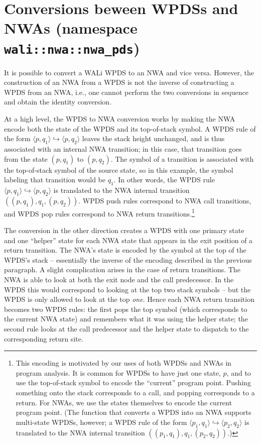 \section{Conversions beween WPDSs and NWAs (namespace
  \texttt{wali::nwa::nwa\_pds})}
\label{Se:Conversions}


It is possible to convert a WALi WPDS to an NWA and vice versa.
However, the construction of an NWA from a WPDS is not the inverse
of constructing a WPDS from an NWA, i.e., one cannot perform the two
conversions in sequence and obtain the identity conversion.

At a high level, the WPDS to NWA conversion works by making the NWA encode both the state
of the WPDS and its top-of-stack symbol. A WPDS rule of the form $\langle
p,q_1 \rangle \hookrightarrow \langle p,q_2 \rangle$ leaves the stack height
unchanged, and is thus associated with an internal NWA transition; in this
case, that transition goes from the state $(p,q_1)$ to $(p,q_2)$. The symbol
of a transition is associated with the top-of-stack symbol of the source
state, so in this example, the symbol labeling that transition would be
$q_1$. In other words, the WPDS rule $\langle p,q_1 \rangle \hookrightarrow
\langle p,q_2 \rangle$ is translated to the NWA internal transition
$((p,q_1), q_1, (p,q_2))$.
WPDS push rules correspond to NWA call transitions, and WPDS pop rules
correspond to NWA return transitions.\footnote{
This encoding is motivated by our uses of both WPDSs and NWAs in program
analysis. It is common for WPDSs to have just one state, $p$, and to use the
top-of-stack symbol to encode the ``current'' program point. Pushing
something onto the stack corresponds to a call, and popping corresponds to a
return. For NWAs, we use the states themselves to encode the current program
point. (The function that
converts a WPDS into an NWA supports multi-state WPDSs, however; a WPDS rule
of the form $\langle p_1,q_1 \rangle \hookrightarrow
\langle p_2,q_2 \rangle$ is translated to the NWA internal transition
$((p_1,q_1), q_1, (p_2,q_2))$.)}

The conversion in the other direction creates a WPDS with one primary state
and one ``helper'' state for each NWA state that appears in the exit position
of a return transition. The NWA's state is encoded by the symbol at the top of the WPDS's
stack -- essentially the inverse of the encoding described in the previous
paragraph. A slight complication arises in the case of return
transitions. The NWA is able to look at both the exit node and the call
predecessor. In the WPDS this would correspond to looking at the top two stack
symbols -- but the WPDS is only allowed to look at the top \emph{one}. Hence each NWA return transition becomes
two WPDS rules: the first pops the top symbol (which corresponds to the
current NWA state) and remembers what it was using the helper state; the
second rule looks at the call predecessor and the helper state to dispatch to
the corresponding return site.


